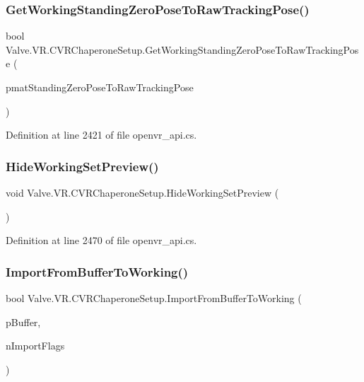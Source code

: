 \subsubsection{\texorpdfstring{GetWorkingStandingZeroPoseToRawTrackingPose()}{GetWorkingStandingZeroPoseToRawTrackingPose()}}
{\footnotesize\ttfamily bool Valve.\+V\+R.\+C\+V\+R\+Chaperone\+Setup.\+Get\+Working\+Standing\+Zero\+Pose\+To\+Raw\+Tracking\+Pose (\begin{DoxyParamCaption}\item[{ref \mbox{\hyperlink{struct_valve_1_1_v_r_1_1_hmd_matrix34__t}{Hmd\+Matrix34\+\_\+t}}}]{pmat\+Standing\+Zero\+Pose\+To\+Raw\+Tracking\+Pose }\end{DoxyParamCaption})}



Definition at line 2421 of file openvr\+\_\+api.\+cs.

\mbox{\label{class_valve_1_1_v_r_1_1_c_v_r_chaperone_setup_aa648b650438df3c243c3a6ada856ce7d}} 
\subsubsection{\texorpdfstring{HideWorkingSetPreview()}{HideWorkingSetPreview()}}
{\footnotesize\ttfamily void Valve.\+V\+R.\+C\+V\+R\+Chaperone\+Setup.\+Hide\+Working\+Set\+Preview (\begin{DoxyParamCaption}{ }\end{DoxyParamCaption})}



Definition at line 2470 of file openvr\+\_\+api.\+cs.

\mbox{\label{class_valve_1_1_v_r_1_1_c_v_r_chaperone_setup_ad926c2713b34a03cc1f6c9ab8f0bcf79}} 
\subsubsection{\texorpdfstring{ImportFromBufferToWorking()}{ImportFromBufferToWorking()}}
{\footnotesize\ttfamily bool Valve.\+V\+R.\+C\+V\+R\+Chaperone\+Setup.\+Import\+From\+Buffer\+To\+Working (\begin{DoxyParamCaption}\item[{string}]{p\+Buffer,  }\item[{uint}]{n\+Import\+Flags }\end{DoxyParamCaption})}



